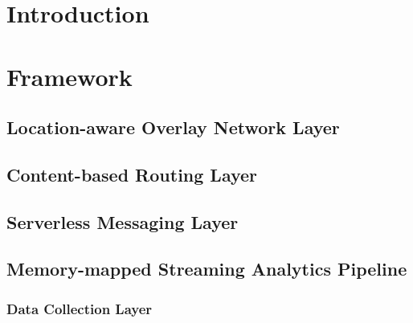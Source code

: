 \section{Introduction}

\section{Framework}

\subsection{Location-aware Overlay Network Layer}

\subsection{Content-based Routing Layer}\label{sec:frameworkc}

\subsection{Serverless Messaging Layer}\label{sec:serverless}

\subsection{Memory-mapped Streaming Analytics Pipeline}

\subsubsection{Data Collection Layer}

